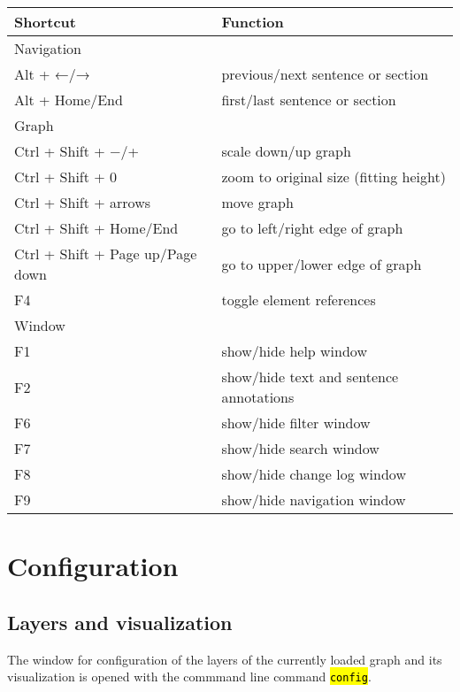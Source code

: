 \documentclass[12pt]{scrartcl}
\newcommand{\code}[1]{\hl{\texttt{#1}}}
\begin{document}
\begin{center}
	\begin{tabular*}{\textwidth}{ll}
		\toprule
		Shortcut & Function \\
		\midrule
		Navigation & \\
		\midrule
			Alt + ←/→ & previous/next sentence or section\\
			Alt + Home/End & first/last sentence or section \\
		\midrule
		Graph & \\
		\midrule
			Ctrl + Shift + −/+ & scale down/up graph\\
			Ctrl + Shift + 0 & zoom to original size (fitting height) \\
			Ctrl + Shift + arrows & move graph\\
			Ctrl + Shift + Home/End & go to left/right edge of graph\\
			Ctrl + Shift + Page up/Page down& go to upper/lower edge of graph\\
			F4 & toggle element references\\
		\midrule
		Window & \\
		\midrule
			F1 & show/hide help window \\
			F2 & show/hide text and sentence annotations\\
			F6 & show/hide filter window\\
			F7 & show/hide search window\\
			F8 & show/hide change log window\\
			F9 & show/hide navigation window\\
		\bottomrule
	\end{tabular*}
\end{center}



\section{Configuration}\label{konfiguration}

\subsection{Layers and visualization}\label{ebenenkonfiguration}

The window for configuration of the layers of the currently loaded graph and its visualization is opened with the commmand line command \code{config}.
\end{document}
